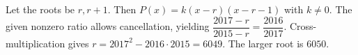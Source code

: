 Let the roots be $r,r+1$. Then $P(x)=k(x-r)(x-r-1)$ with $k\ne0$. The given nonzero ratio allows cancellation, yielding $\dfrac{2017-r}{2015-r}=\dfrac{2016}{2017}$. Cross-multiplication gives $r=2017^2-2016\cdot2015=6049$. The larger root is $\boxed{6050}$.
